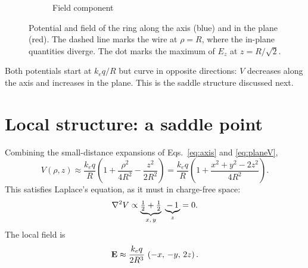 \documentclass[11pt,a4paper]{article}
\newcommand{\ke}{k_e}
\begin{document}
\begin{figure}[h]
\begin{subfigure}{0.49\textwidth}
\caption{Field component}
\end{subfigure}
\caption{Potential and field of the ring along the axis (blue) and in the plane (red). The dashed line marks the wire at $\rho=R$, where the in-plane quantities diverge. The dot marks the maximum of $E_z$ at $z=R/\sqrt2$.}
\label{fig:profiles}
\end{figure}

Both potentials start at $\ke q/R$ but curve in opposite directions: $V$ decreases along the axis and increases in the plane. This is the saddle structure discussed next.

\section{Local structure: a saddle point}

Combining the small-distance expansions of Eqs.~\eqref{eq:axis} and \eqref{eq:planeV},
\begin{equation}
V(\rho,z)\approx\frac{\ke q}{R}\left(1+\frac{\rho^2}{4R^2}-\frac{z^2}{2R^2}\right)
=\frac{\ke q}{R}\left(1+\frac{x^2+y^2-2z^2}{4R^2}\right).
\label{eq:local}
\end{equation}
This satisfies Laplace's equation, as it must in charge-free space:
\begin{equation}
\laplacian V \propto \underbrace{\tfrac12+\tfrac12}_{x,\,y}\;\underbrace{-\,1}_{z} = 0 .
\end{equation}
The local field is
\begin{equation}
\vb E \approx \frac{\ke q}{2R^3}\,\left(-x,\,-y,\,2z\right).
\label{eq:localE}
\end{equation}
\end{document}
